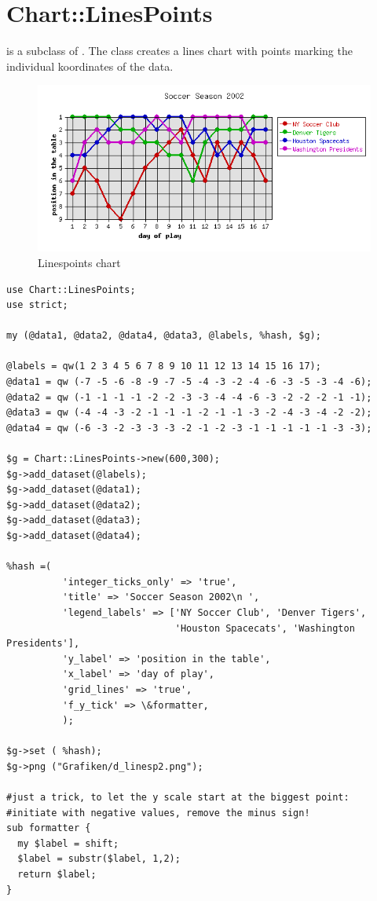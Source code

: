 %
%
\section{Chart::LinesPoints}
\begin{Description} 
 is a subclass of .
The class  creates a lines chart with points marking the 
individual koordinates of the data.
\end{Description}


\begin{figure}[h]
	\begin{center}
		\includegraphics[scale=0.6]{d_linesp2.png}
	\end{center}
	\caption{Linespoints chart}
	\label{fig:d_linesp2}
\end{figure}
\begin{verbatim}
use Chart::LinesPoints;
use strict;

my (@data1, @data2, @data4, @data3, @labels, %hash, $g);

@labels = qw(1 2 3 4 5 6 7 8 9 10 11 12 13 14 15 16 17);
@data1 = qw (-7 -5 -6 -8 -9 -7 -5 -4 -3 -2 -4 -6 -3 -5 -3 -4 -6);
@data2 = qw (-1 -1 -1 -1 -2 -2 -3 -3 -4 -4 -6 -3 -2 -2 -2 -1 -1);
@data3 = qw (-4 -4 -3 -2 -1 -1 -1 -2 -1 -1 -3 -2 -4 -3 -4 -2 -2);
@data4 = qw (-6 -3 -2 -3 -3 -3 -2 -1 -2 -3 -1 -1 -1 -1 -1 -3 -3);

$g = Chart::LinesPoints->new(600,300);
$g->add_dataset(@labels);
$g->add_dataset(@data1);
$g->add_dataset(@data2);
$g->add_dataset(@data3);
$g->add_dataset(@data4);

%hash =(
          'integer_ticks_only' => 'true',
          'title' => 'Soccer Season 2002\n ',
          'legend_labels' => ['NY Soccer Club', 'Denver Tigers',
                              'Houston Spacecats', 'Washington Presidents'],
          'y_label' => 'position in the table',
          'x_label' => 'day of play',
          'grid_lines' => 'true',
          'f_y_tick' => \&formatter,
          );

$g->set ( %hash);
$g->png ("Grafiken/d_linesp2.png");

#just a trick, to let the y scale start at the biggest point:
#initiate with negative values, remove the minus sign!
sub formatter {
  my $label = shift;
  $label = substr($label, 1,2);
  return $label;
}

\end{verbatim}

